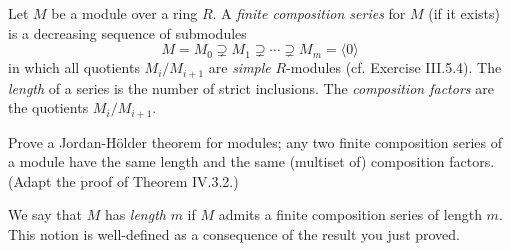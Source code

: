\documentclass[../../master.tex]{subfiles}
\begin{document}
\begin{problem}
    Let $M$ be a module over a ring $R$.
    A \textit{finite composition series} for $M$ (if it exists) is a decreasing sequence of submodules
    \[
        M = M_0 \supsetneq M_1 \supsetneq \cdots \supsetneq M_m = \langle 0 \rangle
    \]
    in which all quotients $M_i / M_{i + 1}$ are \textit{simple} $R$-modules (cf. Exercise III.5.4).
    The \textit{length} of a series is the number of strict inclusions.
    The \textit{composition factors} are the quotients $M_i / M_{i+1}$.

    Prove a Jordan-H\"older theorem for modules;
    any two finite composition series of a module have the same length and the same (multiset of) composition factors.
    (Adapt the proof of Theorem IV.3.2.)

    We say that $M$ has \textit{length} $m$ if $M$ admits a finite composition series of length $m$.
    This notion is well-defined as a consequence of the result you just proved.
\end{problem}
\end{document}
